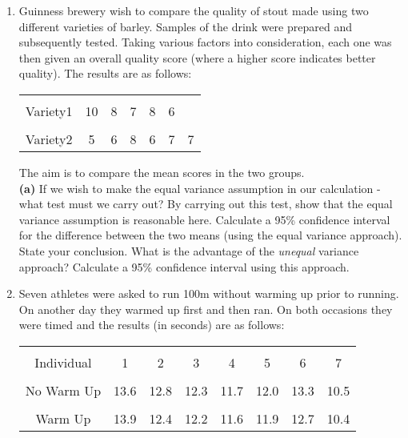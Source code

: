 \documentclass[]{report}
\begin{document}
\begin{enumerate}
	\item 
	Guinness brewery wish to compare the quality of stout made using two different varieties of barley. Samples of the drink were prepared and subsequently tested. Taking various factors into consideration, each one was then given an overall quality score (where a higher score indicates better quality). The results are as follows:\\[-0.3cm]
	\begin{center}
		\begin{tabular}{|c|cccccc|}
			\cline{1-7}
			&&&&&&\\[-0.2cm]
			Variety1 & 10 & 8 & 7 & 8 & 6 & \\[0.2cm]
			\cline{1-7}
			&&&&&&\\[-0.2cm]
			Variety2 & 5  & 6 & 8 & 6 & 7 & 7 \\[0.2cm]
			\cline{1-7}
		\end{tabular}
	\end{center}
	
	The aim is to compare the mean scores in the two groups.\\[0.3cm]
	{\bf(a)} If we wish to make the equal variance assumption in our calculation - what test must we carry out?  By carrying out this test, show that the equal variance assumption is reasonable here.  Calculate a 95\% confidence interval for the difference between the two means (using the equal variance approach). State your conclusion.  What is the advantage of the \emph{unequal} variance approach? Calculate a 95\% confidence interval using this approach.
	
	\item 
	Seven athletes were asked to run 100m without warming up prior to running. On another day they warmed up first and then ran. On both occasions they were timed and the results (in seconds) are as follows:\\[-0.3cm]
	\begin{center}
		\begin{tabular}{|c|ccccccc|}
			\hline
			&&&&&&&\\[-0.3cm]
			Individual & 1 & 2 & 3 & 4 & 5 & 6 & 7 \\[0.1cm]
			\hline
			&&&&&&&\\[-0.3cm]
			No Warm Up    & 13.6 & 12.8 & 12.3 & 11.7 & 12.0 & 13.3 & 10.5 \\[0.1cm]
			\hline
			&&&&&&&\\[-0.3cm]
			Warm Up       & 13.9 & 12.4 & 12.2 & 11.6 & 11.9 & 12.7 & 10.4 \\[0.1cm]
			\hline
		\end{tabular}
	\end{center}
	

\end{enumerate}
\end{document}
